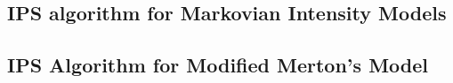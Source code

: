 \subsection{IPS algorithm for Markovian Intensity Models}
\subsection{IPS Algorithm for Modified Merton's Model}

